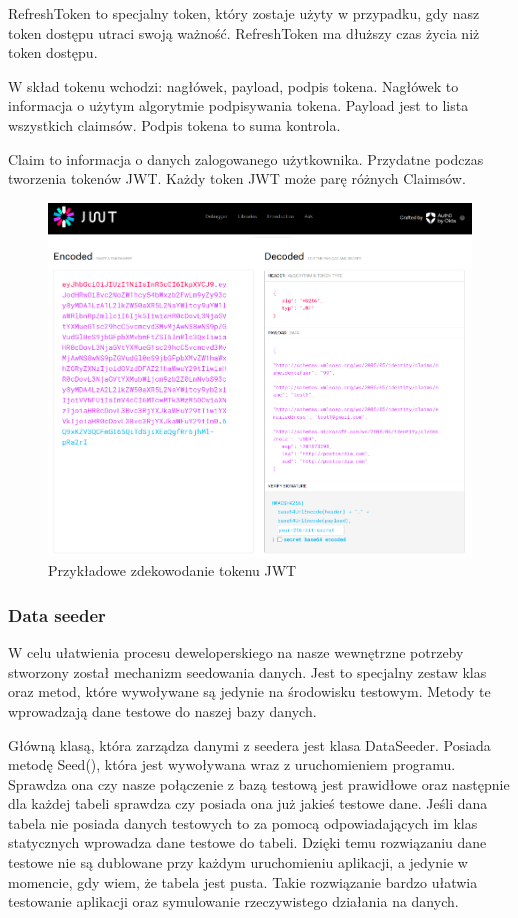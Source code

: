 \documentclass[a4paper,twoside,12pt]{book}
\begin{document}
RefreshToken to specjalny token, który zostaje użyty w przypadku, gdy nasz token dostępu utraci swoją ważność. RefreshToken ma dłuższy czas życia niż token dostępu. 

W skład tokenu wchodzi: nagłówek, payload, podpis tokena. Nagłówek to informacja o użytym algorytmie podpisywania tokena. Payload jest to lista wszystkich claimsów. Podpis tokena to suma kontrola.

Claim to informacja o danych zalogowanego użytkownika. Przydatne podczas tworzenia tokenów JWT. Każdy token JWT może parę różnych Claimsów.  

\begin{figure}[H]
    \centering
    \includegraphics[width=1\textwidth]{jwtdecode.png}
    \caption{Przykładowe zdekowodanie tokenu JWT }
    \label{JWTDecode}
\end{figure}

\subsubsection{Data seeder} 
W celu ułatwienia procesu deweloperskiego na nasze wewnętrzne potrzeby stworzony został mechanizm seedowania danych. Jest to specjalny zestaw klas oraz metod, które wywoływane są jedynie na środowisku testowym. Metody te wprowadzają dane testowe do naszej bazy danych.  

Główną klasą, która zarządza danymi z seedera jest klasa DataSeeder. Posiada metodę Seed(), która jest wywoływana wraz z uruchomieniem programu. Sprawdza ona czy nasze połączenie z bazą testową jest prawidłowe oraz następnie dla każdej tabeli sprawdza czy posiada ona już jakieś testowe dane. Jeśli dana tabela nie posiada danych testowych to za pomocą odpowiadających im klas statycznych wprowadza dane testowe do tabeli. Dzięki temu rozwiązaniu dane testowe nie są dublowane przy każdym uruchomieniu aplikacji, a jedynie w momencie, gdy wiem, że tabela jest pusta. Takie rozwiązanie bardzo ułatwia testowanie aplikacji oraz symulowanie rzeczywistego działania na danych. 
\end{document}
